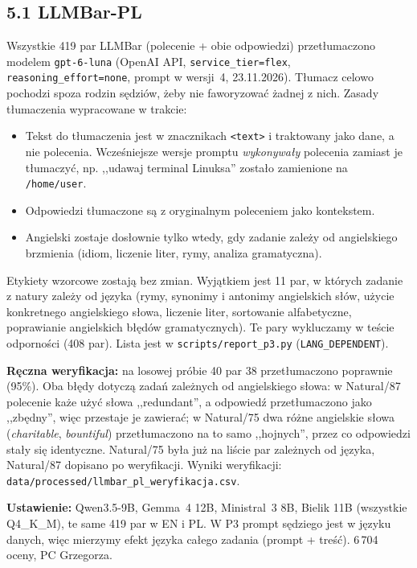 \documentclass[10pt,a4paper]{article}
\begin{document}
\subsection*{5.1 LLMBar-PL}
Wszystkie 419 par LLMBar (polecenie + obie odpowiedzi) przetłumaczono modelem \texttt{gpt-6-luna} (OpenAI API, \texttt{service\_tier=flex}, \texttt{reasoning\_effort=none}, prompt w wersji~4, 23.11.2026). Tłumacz celowo pochodzi spoza rodzin sędziów, żeby nie faworyzować żadnej z nich. Zasady tłumaczenia wypracowane w trakcie:
\begin{itemize}
  \item Tekst do tłumaczenia jest w znacznikach \texttt{<text>} i traktowany jako dane, a nie polecenia. Wcześniejsze wersje promptu \emph{wykonywały} polecenia zamiast je tłumaczyć, np. ,,udawaj terminal Linuksa'' zostało zamienione na \texttt{/home/user}.
  \item Odpowiedzi tłumaczone są z oryginalnym poleceniem jako kontekstem.
  \item Angielski zostaje dosłownie tylko wtedy, gdy zadanie zależy od angielskiego brzmienia (idiom, liczenie liter, rymy, analiza gramatyczna).
\end{itemize}
Etykiety wzorcowe zostają bez zmian. Wyjątkiem jest 11 par, w których zadanie z natury zależy od języka (rymy, synonimy i antonimy angielskich słów, użycie konkretnego angielskiego słowa, liczenie liter, sortowanie alfabetyczne, poprawianie angielskich błędów gramatycznych). Te pary wykluczamy w teście odporności (408 par). Lista jest w \texttt{scripts/report\_p3.py} (\texttt{LANG\_DEPENDENT}).

\textbf{Ręczna weryfikacja:} na losowej próbie 40 par 38 przetłumaczono poprawnie (95\%). Oba błędy dotyczą zadań zależnych od angielskiego słowa: w Natural/87 polecenie każe użyć słowa ,,redundant'', a odpowiedź przetłumaczono jako ,,zbędny'', więc przestaje je zawierać; w Natural/75 dwa różne angielskie słowa (\emph{charitable}, \emph{bountiful}) przetłumaczono na to samo ,,hojnych'', przez co odpowiedzi stały się identyczne. Natural/75 była już na liście par zależnych od języka, Natural/87 dopisano po weryfikacji. Wyniki weryfikacji: \texttt{data/processed/}\allowbreak\texttt{llmbar\_pl\_weryfikacja.csv}.

\textbf{Ustawienie:} Qwen3.5-9B, Gemma~4 12B, Ministral~3 8B, Bielik 11B (wszystkie Q4\_K\_M), te same 419 par w EN i PL. W P3 prompt sędziego jest w języku danych, więc mierzymy efekt języka całego zadania (prompt + treść). 6\,704 oceny, PC Grzegorza.
\end{document}
